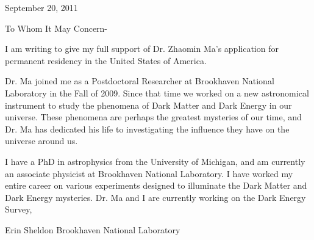 \documentclass[12pt]{letter}
\begin{document}
\hfill September 20,  2011
\newline

To Whom It May Concern-

I am writing to give my full support of Dr. Zhaomin Ma's application for permanent
residency in the United States of America.

Dr. Ma joined me as a Postdoctoral Researcher at Brookhaven National Laboratory
in the Fall of 2009.  Since that time we worked on a new astronomical
instrument to study the phenomena of Dark Matter and Dark Energy in our
universe.  These phenomena are perhaps the greatest mysteries of our time, and
Dr. Ma has dedicated his life to investigating the influence they have on the
universe around us.

I have a PhD in astrophysics from the University of Michigan, and am currently
an associate physicist at Brookhaven National Laboratory.  I have worked my
entire career on various experiments designed to illuminate the Dark Matter and
Dark Energy mysteries.  Dr. Ma and I are currently working on the Dark Energy
Survey,




{\noindent Erin Sheldon}
\newline
{\noindent Brookhaven National Laboratory}
\end{document}
